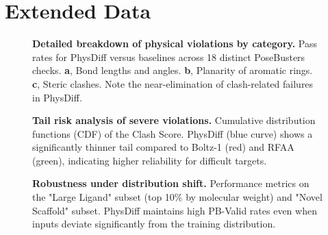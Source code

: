 \documentclass[twocolumn,10pt]{article}
\newcommand{\modelname}{PhysDiff}
\begin{document}
\section*{Extended Data}

\setcounter{figure}{0}
\setcounter{table}{0}
\renewcommand{\figurename}{Extended Data Fig.}
\renewcommand{\tablename}{Extended Data Table}


\begin{figure}[h]
    \centering
    \caption{\textbf{Detailed breakdown of physical violations by category.} 
    Pass rates for \modelname{} versus baselines across 18 distinct PoseBusters checks. 
    \textbf{a}, Bond lengths and angles. 
    \textbf{b}, Planarity of aromatic rings. 
    \textbf{c}, Steric clashes. 
    Note the near-elimination of clash-related failures in \modelname{}.
    }
    \label{fig:posebusters_breakdown}
\end{figure}

\begin{figure}[h]
    \centering
    \caption{\textbf{Tail risk analysis of severe violations.} 
    Cumulative distribution functions (CDF) of the Clash Score. 
    \modelname{} (blue curve) shows a significantly thinner tail compared to Boltz-1 (red) and RFAA (green), indicating higher reliability for difficult targets.
    }
    \label{fig:tail_risk}
\end{figure}

\begin{figure}[h]
    \centering
    \caption{\textbf{Robustness under distribution shift.} 
    Performance metrics on the "Large Ligand" subset (top 10\% by molecular weight) and "Novel Scaffold" subset. 
    \modelname{} maintains high PB-Valid rates even when inputs deviate significantly from the training distribution.
    }
    \label{edfig:ood}
\end{figure}
\end{document}
